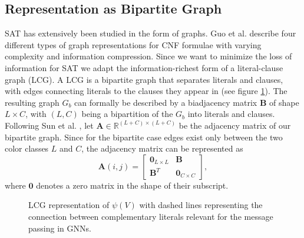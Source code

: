 \subsection{Representation as Bipartite Graph}
SAT has extensively been studied in the form of graphs. Guo et al. \cite{guo2023machine} describe four different types of graph representations for CNF formulae with varying complexity and information compression. Since we want to minimize the loss of information for SAT we adapt the information-richest form of a literal-clause graph (LCG). 
A LCG is a bipartite graph that separates literals and clauses, with edges connecting literals to the clauses they appear in (see figure \ref{fig:lcg-sat}).
The resulting graph $G_b$ can formally be described by a biadjacency matrix $\mathbf{B}$ of shape $L \times C$, with $(L,C)$ being a bipartition of the $G_b$ into literals and clauses. \\
Following Sun et al. \cite{articleBiadjacency}, let $\mathbf{A} \in \mathbb{R}^{(L+C) \times (L+C)}$ be the adjacency matrix of our bipartite graph. Since for the bipartite case edges exist only between the two color classes $L$ and $C$, the adjacency matrix can be represented as
\begin{equation}
    \mathbf{A}(i,j) = \begin{bmatrix}
        \mathbf{0}_{L \times L} & \mathbf{B} \\
        \mathbf{B}^T & \mathbf{0}_{C \times C}
    \end{bmatrix},
\end{equation}
where $\mathbf{0}$ denotes a zero matrix in the shape of their subscript. \bigskip

\begin{figure}[h]
    \centering
    \caption{LCG representation of $\psi(V)$ with dashed lines representing the connection between complementary literals relevant for the message passing in GNNs.}
    \label{fig:lcg-sat}
\end{figure}


